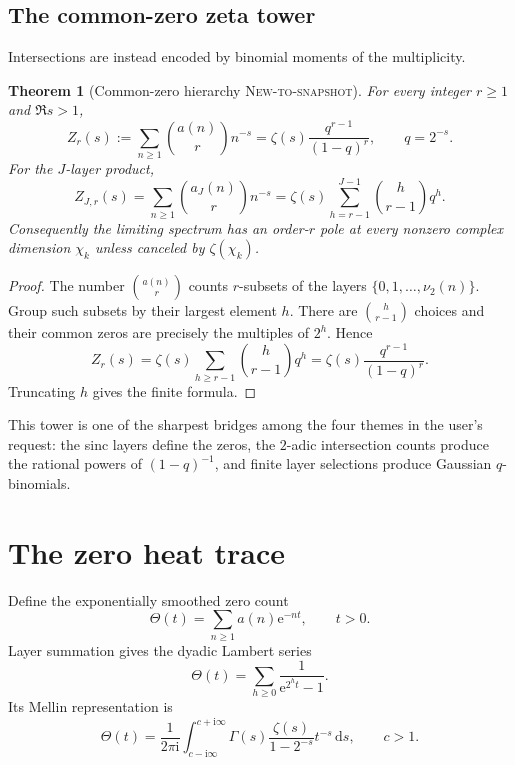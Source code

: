 \documentclass[11pt,oneside]{article}
\numberwithin{equation}{section}
\newtheorem{theorem}{Theorem}[section]
\theoremstyle{definition}
\theoremstyle{remark}
\newcommand{\dd}{\,\mathrm d}
\newcommand{\ii}{\mathrm i}
\newcommand{\e}{\mathrm e}
\newcommand{\NewResult}{\textsc{New-to-snapshot}}
\begin{document}
\subsection{The common-zero zeta tower}

Intersections are instead encoded by binomial moments of the multiplicity.

\begin{theorem}[Common-zero hierarchy \NewResult]
\label{thm:common-zero}
For every integer $r\ge1$ and $\Re s>1$,
\begin{equation}
 Z_r(s):=\sum_{n\ge1}\binom{a(n)}r n^{-s}
 =\zeta(s)\frac{q^{r-1}}{(1-q)^r},\qquad q=2^{-s}.         \label{eq:Zr}
\end{equation}
For the $J$-layer product,
\begin{equation}
 Z_{J,r}(s)=\sum_{n\ge1}\binom{a_J(n)}r n^{-s}
 =\zeta(s)\sum_{h=r-1}^{J-1}\binom{h}{r-1}q^h.           \label{eq:ZJr}
\end{equation}
Consequently the limiting spectrum has an order-$r$ pole at every nonzero
complex dimension $\chi_k$ unless canceled by $\zeta(\chi_k)$.
\end{theorem}

\begin{proof}
The number $\binom{a(n)}r$ counts $r$-subsets of the layers
$\{0,1,\ldots,\nu_2(n)\}$.  Group such subsets by their largest element $h$.
There are $\binom{h}{r-1}$ choices and their common zeros are precisely the
multiples of $2^h$.  Hence
\[
 Z_r(s)=\zeta(s)\sum_{h\ge r-1}\binom{h}{r-1}q^h
 =\zeta(s)\frac{q^{r-1}}{(1-q)^r}.
\]
Truncating $h$ gives the finite formula.
\end{proof}

This tower is one of the sharpest bridges among the four themes in the user's
request: the sinc layers define the zeros, the $2$-adic intersection counts
produce the rational powers of $(1-q)^{-1}$, and finite layer selections produce
Gaussian $q$-binomials.

\section{The zero heat trace}
\label{sec:heat}

Define the exponentially smoothed zero count
\begin{equation}
 \Theta(t)=\sum_{n\ge1}a(n)\e^{-nt},\qquad t>0.            \label{eq:Theta}
\end{equation}
Layer summation gives the dyadic Lambert series
\begin{equation}
 \Theta(t)=\sum_{h\ge0}\frac1{\e^{2^ht}-1}.               \label{eq:Theta-Lambert}
\end{equation}
Its Mellin representation is
\begin{equation}
 \Theta(t)=\frac1{2\pi\ii}\int_{c-\ii\infty}^{c+\ii\infty}
 \Gamma(s)\frac{\zeta(s)}{1-2^{-s}}t^{-s}\dd s,
 \qquad c>1.                                               \label{eq:Theta-Mellin}
\end{equation}
\end{document}
